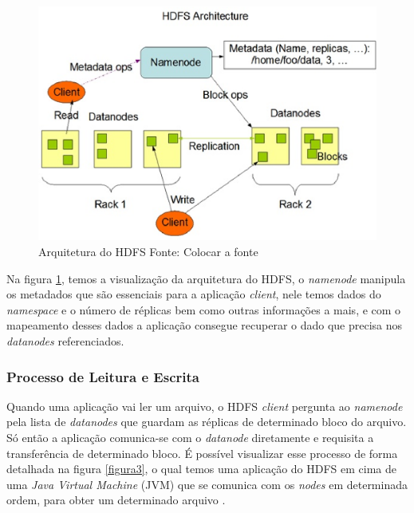                 \begin{figure}[ht!]
                    \centering
                    \includegraphics[keepaspectratio=true,scale=0.75]
                        {figuras/figura2.eps}
                    \caption[Arquitetura do HDFS]{Arquitetura do HDFS
                    \protect\linebreak Fonte: Colocar a fonte}
                    \label{figura2}
                \end{figure}

                Na figura \ref{figura2}, temos a visualização da arquitetura do HDFS, o \textit{namenode} manipula
                os metadados que são essenciais para a aplicação \textit{client}, nele temos dados do \textit{namespace}
                e o número de réplicas bem como outras informações a mais, e com o mapeamento desses dados a
                aplicação consegue recuperar o dado que precisa nos \textit{datanodes} referenciados.

            \subsubsection{Processo de Leitura e Escrita}

                Quando uma aplicação vai ler um arquivo, o HDFS \textit{client} pergunta ao \textit{namenode} pela
                lista de \textit{datanodes} que guardam as réplicas de determinado bloco do arquivo. Só então a
                aplicação comunica-se com o \textit{datanode} diretamente e requisita a transferência de determinado
                bloco. É possível visualizar esse processo de forma detalhada na figura \ref{figura3}, o qual temos uma aplicação do
                HDFS em cima de uma \textit{Java Virtual Machine} (JVM) que se comunica com os \textit{nodes} em
                determinada ordem, para obter um determinado arquivo \cite{shvachko2010}.

